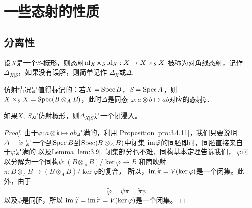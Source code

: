 
\chapter{一些态射的性质}

\section{分离性}

\begin{para}[对角线]
	设$X$是一个$S$-概形，则态射$\operatorname{id}_X\times_S\operatorname{id}_X:X\to X\times_S X$
	被称为对角线态射，记作$\Delta_{X|S}$，如果没有误解，则简单记作
	$\Delta_X$或$\Delta$.
\end{para}

仿射情况是值得标记的：若$X=\operatorname{Spec} B$，$S=\operatorname{Spec} A$，则
$X\times_S X=\operatorname{Spec} (B\otimes_A B)$，此时$\Delta$是同态
$\varphi:a\otimes b\mapsto ab$对应的态射$\widetilde{\varphi}$.

\begin{lem}\label{lem:4.1.2}
	如果$X$, $S$是仿射概形，则$\Delta_{X|S}$是一个闭浸入。
\end{lem}

\begin{proof}
由于$\varphi:a\otimes b\mapsto ab$是满的，利用
Proposition \ref{pro:3.4.11}，我们只要说明$\Delta=\widetilde{\varphi}$
是一个到$\operatorname{Spec} B$到$\operatorname{Spec} (B\otimes_A B)$中闭集
$\operatorname{im} \widetilde{\varphi}$的同胚即可，同胚直接来自于$\varphi$是满的
以及Lemma \ref{lem:3.9}. 闭集部分也不难，同构基本定理告诉我们，
$\varphi$可以分解为一个同构$\psi:(B\otimes_A B)/\ker \varphi\to B$
和商映射$\pi:B\otimes_A B\to (B\otimes_A B)/\ker \varphi$的复合，
所以，$\operatorname{im} \widetilde{\pi}=V(\ker \varphi)$是一个闭集。此外，由于
\[
\widetilde{\varphi}=\widetilde{\psi\pi}=\widetilde{\pi}\widetilde{\psi}
\]
以及$\widetilde{\psi}$是同胚，所以
$\operatorname{im} \widetilde{\varphi}=\operatorname{im} \widetilde{\pi}=V(\ker \varphi)$是一个闭集。
\end{proof}

